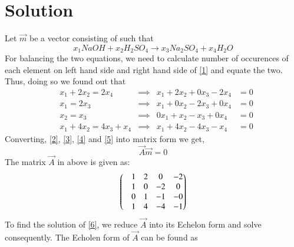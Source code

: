 \documentclass[journal,12pt,twocolumn]{IEEEtran}
\begin{document}
\section{Solution}
Let $\vec{m}$ be a vector consisting of  such that
\begin{equation}\label{1}
 x_1NaOH + x_2H_2SO_4 \xrightarrow{} x_3Na_2SO_4  +  x_4H_2O
\end{equation}
For balancing the two equations, we need to calculate number of occurences of each element on left hand side and right hand side of \ref{1} and equate the two. Thus, doing so we found out that
\begin{align}
& x_1 + 2x_2 = 2x_4 & \implies & x_1 + 2x_2 + 0x_3 - 2x_4 &= 0 \label{2} \\
& x_1 = 2x_3 & \implies & x_1 + 0x_2 - 2x_3 + 0x_4 &= 0 \label{3} \\
& x_2 = x_3 & \implies & 0x_1 + x_2 - x_3 + 0x_4 &= 0 \label{4} \\
& x_1 + 4x_2 = 4x_3 + x_4 & \implies & x_1 + 4x_2 - 4x_3 - x_4 &= 0 \label{5}
\end{align}
Converting, \ref{2}, \ref{3}, \ref{4} and \ref{5} into matrix form we get,
\begin{equation}\label{6}
	\vec{A}\vec{m} = 0
\end{equation}
The matrix $\vec{A}$ in above is given as:
\begin{equation}
	\begin{pmatrix}&1 &2 &0 &-2 \\ &1 &0 &-2 &0 \\ &0 &1 &-1 &-0 \\&1 &4 &-4 &-1\end{pmatrix}
\end{equation}
To find the solution of \ref{6}, we reduce $\vec{A}$ into its Echelon form and solve consequently. The Echolen form of $\vec{A}$ can be found as
\end{document}
